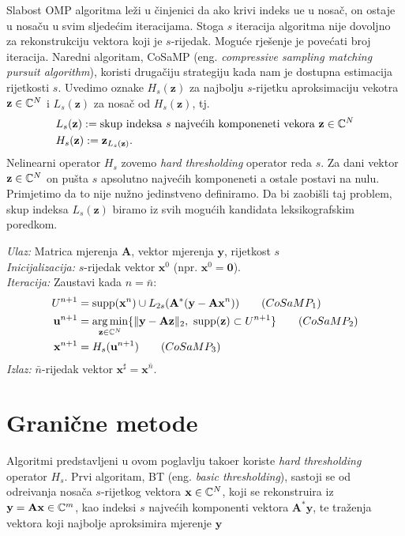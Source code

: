 \documentclass[a4paper,twoside,12pt]{memoir} %
\newcommand{\vect}[1]{\mathbf{#1}}
\renewcommand{\vec}{\vect}
\newcommand{\supp}{\text{\normalfont{supp}}}
\newcommand{\norm}[1]{\|{#1}\|}
\DeclareMathOperator*{\argmin}{arg\,min}
\newenvironment{alg}[1]
{
    \bigskip
    \begin{tcolorbox}[arc=0mm,boxrule=1.2pt,colframe=black,colback=white,detach title, before upper={\medskip\begin{center}\textbf{#1}\end{center}\hline\newline\medskip},frame hidden]
    \medskip
}
{
    \medskip
\end{tcolorbox}
    \bigskip
}
\begin{document}
\indent
Slabost OMP algoritma le\v{z}i u \v{c}injenici da ako krivi indeks u\dj e u nosa\v{c}, on ostaje u nosa\v{c}u u svim sljede\'cim iteracijama. Stoga $s$ iteracija algoritma nije dovoljno za rekonstrukciju vektora koji je $s$-rijedak. Mogu\'ce rje\v{s}enje je pove\'cati broj iteracija. Naredni algoritam, CoSaMP (eng. \textit{compressive sampling matching pursuit algorithm}), koristi druga\v{c}iju strategiju kada nam je dostupna estimacija rijetkosti $s$. Uvedimo oznake $H_s(\vec z)$ za najbolju $s$-rijetku aproksimaciju vekotra $\vec z \in \C^N$ i $L_s(\vec z)$ za nosa\v{c} od $H_s(\vec z)$, tj.
\begin{align}
    &L_s(\vec z) := \text{skup indeksa $s$ najve\'cih komponeneti vekora } \vec z \in \C^N \\
    &H_s(\vec z) := \vec z_{L_s(\vec z)}.
\end{align}
Nelinearni operator $H_s$ zovemo \textit{hard thresholding} operator reda $s$. Za dani vektor $\vec z \in \C^N$ on pu\v{s}ta $s$ apsolutno najve\'cih komponeneti a ostale postavi na nulu. Primjetimo da to nije nu\v{z}no jedinstveno definiramo. Da bi zaobi\v{s}li taj problem, skup indeksa $L_s(\vec z)$ biramo iz svih mogu\'cih kandidata leksikografskim poredkom.

\begin{alg}{CoSaMP}
    \textit{Ulaz:} Matrica mjerenja $\vec A$, vektor mjerenja $\vec y$, rijetkost $s$ \\
    \textit{Inicijalizacija:} $s$-rijedak vektor $\vec x^0$ (npr. $\vec x^0 = \vec 0$).\\
    \textit{Iteracija:} Zaustavi kada $n = \bar{n}$:
        \begin{align*}
            U^{n+1} & = \supp(\vec x^n)\cup L_{2s}(\vec A^*(\vec y - \vec{Ax}^n))  \tag{$CoSaMP_1$}\label{cosamp_1}\\
            \vec u^{n+1} & = \argmin_{\vec z \in \C^N}\{\norm{\vec y - \vec{Az}}_2,\ \supp(\vec z) \subset U^{n+1}\}  \tag{$CoSaMP_2$}\label{cosamp_2}\\
            \vec x^{n+1} & = H_s(\vec u^{n+1})  \tag{$CoSaMP_3$}\label{cosamp_3}
        \end{align*}
        \textit{Izlaz:} $\bar{n}$-rijedak vektor $\vec x^{\sharp}=\vec{x}^{\bar{n}}$.
\end{alg}



\section[Grani\v{c}ne metode][Grani\v{c}ne metode]{Grani\v{c}ne metode}
Algoritmi predstavljeni u ovom poglavlju tako\dj er koriste \textit{hard thresholding} operator $H_s$. Prvi algoritam, BT (eng. \textit{basic thresholding}), sastoji se od odre\dj ivanja nosa\v{c}a $s$-rijetkog vektora $\vec x \in \C^N$, koji se rekonstruira iz $\vec y = \vec{Ax} \in \C^m$, kao indeksi $s$ najve\'cih komponenti vektora $\vec A^* \vec y$, te tra\v{z}enja vektora koji najbolje aproksimira mjerenje $\vec y$
\end{document}
